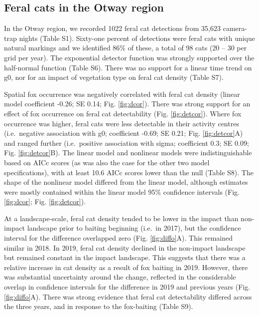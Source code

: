 \documentclass[]{elsarticle} %
\begin{document}
\hypertarget{feral-cats-in-the-otway-region}{%
\subsection{Feral cats in the Otway region}\label{feral-cats-in-the-otway-region}}

In the Otway region, we recorded 1022 feral cat detections from 35,623 camera-trap nights (Table S1). Sixty-one percent of detections were feral cats with unique natural markings and we identified 86\% of these, a total of 98 cats (20 -- 30 per grid per year). The exponential detector function was strongly supported over the half-normal function (Table S6). There was no support for a linear time trend on g0, nor for an impact of vegetation type on feral cat density (Table S7).

Spatial fox occurrence was negatively correlated with feral cat density (linear model coefficient -0.26; SE 0.14; Fig. \ref{fig:dcor}). There was strong support for an effect of fox occurrence on feral cat detectability (Fig. \ref{fig:detcor}). Where fox occurrence was higher, feral cats were less detectable in their activity centres (i.e.~negative association with g0; coefficient -0.69; SE 0.21; Fig. \ref{fig:detcor}A) and ranged further (i.e.~positive association with sigma; coefficient 0.3; SE 0.09; Fig. \ref{fig:detcor}B). The linear model and nonlinear models were indistinguishable based on AICc scores (as was also the case for the other two model specifications), with at least 10.6 AICc scores lower than the null (Table S8). The shape of the nonlinear model differed from the linear model, although estimates were mostly contained within the linear model 95\% confidence intervals (Fig. \ref{fig:dcor}; Fig. \ref{fig:detcor}).

At a landscape-scale, feral cat density tended to be lower in the impact than non-impact landscape prior to baiting beginning (i.e.~in 2017), but the confidence interval for the difference overlapped zero (Fig. \ref{fig:diffo}A). This remained similar in 2018. In 2019, feral cat density declined in the non-impact landscape but remained constant in the impact landscape. This suggests that there was a relative increase in cat density as a result of fox baiting in 2019. However, there was substantial uncertainty around the change, reflected in the considerable overlap in confidence intervals for the difference in 2019 and previous years (Fig. \ref{fig:diffo}A). There was strong evidence that feral cat detectability differed across the three years, and in response to the fox-baiting (Table S9).
\end{document}
